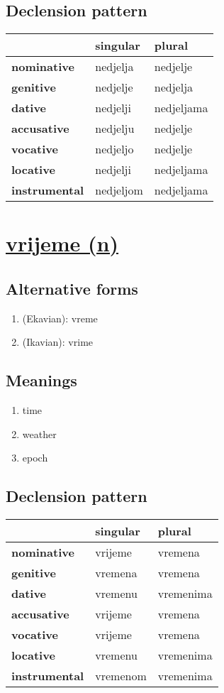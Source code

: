 \subsection*{Declension pattern}
\begin{tabularx}{\linewidth}{Xll}
\toprule
{} &   singular &      plural \\
\midrule
\textbf{nominative  } &   nedjelja &    nedjelje \\
\textbf{genitive    } &   nedjelje &    nedjelja \\
\textbf{dative      } &   nedjelji &  nedjeljama \\
\textbf{accusative  } &   nedjelju &    nedjelje \\
\textbf{vocative    } &   nedjeljo &    nedjelje \\
\textbf{locative    } &   nedjelji &  nedjeljama \\
\textbf{instrumental} &  nedjeljom &  nedjeljama \\
\bottomrule
\end{tabularx}

\filbreak
\section{\underline{vrijeme (n)}}
\subsection*{Alternative forms}
\begin{enumerate}
\item (Ekavian): vreme
\item (Ikavian): vrime
\end{enumerate}
\subsection*{Meanings}
\begin{enumerate}
\item time
\item weather
\item epoch
\end{enumerate}
\subsection*{Declension pattern}
\begin{tabularx}{\linewidth}{Xll}
\toprule
{} &  singular &     plural \\
\midrule
\textbf{nominative  } &   vrijeme &    vremena \\
\textbf{genitive    } &   vremena &    vremena \\
\textbf{dative      } &   vremenu &  vremenima \\
\textbf{accusative  } &   vrijeme &    vremena \\
\textbf{vocative    } &   vrijeme &    vremena \\
\textbf{locative    } &   vremenu &  vremenima \\
\textbf{instrumental} &  vremenom &  vremenima \\
\bottomrule
\end{tabularx}

